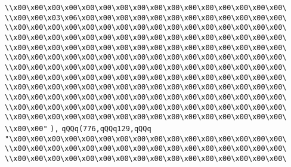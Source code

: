 \verb|\\x00\x00\x00\x00\x00\x00\x00\x00\x00\x00\x00\x00\x00\x00\x00\x00\|\newline
\verb|\\x00\x00\x03\x06\x00\x00\x00\x00\x00\x00\x00\x00\x00\x00\x00\x00\|\newline
\verb|\\x00\x00\x00\x00\x00\x00\x00\x00\x00\x00\x00\x00\x00\x00\x00\x00\|\newline
\verb|\\x00\x00\x00\x00\x00\x00\x00\x00\x00\x00\x00\x00\x00\x00\x00\x00\|\newline
\verb|\\x00\x00\x00\x00\x00\x00\x00\x00\x00\x00\x00\x00\x00\x00\x00\x00\|\newline
\verb|\\x00\x00\x00\x00\x00\x00\x00\x00\x00\x00\x00\x00\x00\x00\x00\x00\|\newline
\verb|\\x00\x00\x00\x00\x00\x00\x00\x00\x00\x00\x00\x00\x00\x00\x00\x00\|\newline
\verb|\\x00\x00\x00\x00\x00\x00\x00\x00\x00\x00\x00\x00\x00\x00\x00\x00\|\newline
\verb|\\x00\x00\x00\x00\x00\x00\x00\x00\x00\x00\x00\x00\x00\x00\x00\x00\|\newline
\verb|\\x00\x00\x00\x00\x00\x00\x00\x00\x00\x00\x00\x00\x00\x00\x00\x00\|\newline
\verb|\\x00\x00\x00\x00\x00\x00\x00\x00\x00\x00\x00\x00\x00\x00\x00\x00\|\newline
\verb|\\x00\x00\x00\x00\x00\x00\x00\x00\x00\x00\x00\x00\x00\x00\x00\x00\|\newline
\verb|\\x00\x00"|\newline
\verb|),|\newline
\verb|qQQq(776,qQQq129,qQQq|\newline
\verb|"\x00\x00\x00\x00\x00\x00\x00\x00\x00\x00\x00\x00\x00\x00\x00\x00\|\newline
\verb|\\x00\x00\x00\x00\x00\x00\x00\x00\x00\x00\x00\x00\x00\x00\x00\x00\|\newline
\verb|\\x00\x00\x00\x00\x00\x00\x00\x00\x00\x00\x00\x00\x00\x00\x00\x00\|\newline

